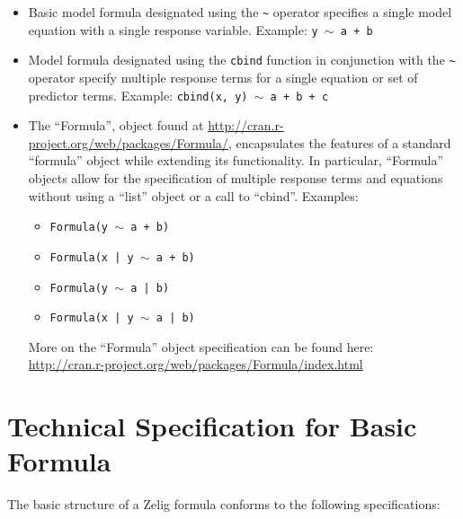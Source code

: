 \documentclass{article}
\newcommand{\tweedly}[0]{$\sim${ }}
\begin{document}
\begin{itemize}

  \item Basic model formula designated using the \verb+~+ operator specifies a single
    model equation with a single response variable. Example: 
    {\tt y \tweedly a + b}

  \item Model formula designated using the \verb+cbind+ function in conjunction
    with the \verb+~+ operator specify multiple response terms for a single
    equation or set of predictor terms. Example: 
    {\tt cbind(x, y) \tweedly a + b + c}

  \item The ``Formula'', object found at
    \url{http://cran.r-project.org/web/packages/Formula/}, encapsulates the
    features of a standard ``formula'' object while extending its functionality.
    In particular, ``Formula'' objects allow for the specification of multiple
    response terms and equations without using a ``list'' object or a call to
    ``cbind''. Examples:
    \begin{itemize}
      \item {\tt Formula(y \tweedly a + b)}
      \item {\tt Formula(x | y \tweedly a + b)}
      \item {\tt Formula(y \tweedly a | b)}
      \item {\tt Formula(x | y \tweedly a | b)}
   \end{itemize}
   More on the ``Formula'' object specification can be found here:\\
   \url{http://cran.r-project.org/web/packages/Formula/index.html}

\end{itemize}





\section{Technical Specification for Basic Formula}

The basic structure of a Zelig formula conforms to the following specifications:
\end{document}
